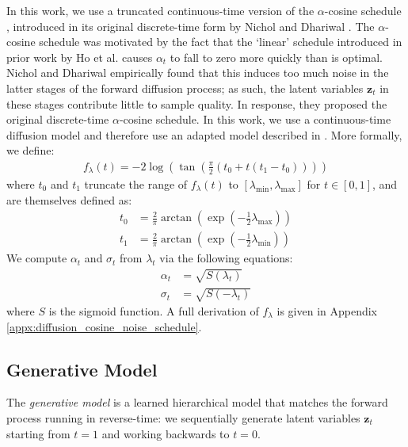 \documentclass[ oneside,%
                    author={George Herbert},
                    degree={MSci},
                     title={Video Diffusion Models for Climate Simulations},
                  subtitle={}]{dissertation}
\begin{document}
In this work, we use a truncated continuous-time version of the $\alpha$-cosine schedule \cite{IDDPM_Nichol}, introduced in its original discrete-time form by Nichol and Dhariwal \cite{IDDPM_Nichol}. The $\alpha$-cosine schedule was motivated by the fact that the `linear' schedule introduced in prior work by Ho et al. \cite{DDPM_Ho} causes $\alpha_t$ to fall to zero more quickly than is optimal. Nichol and Dhariwal empirically found that this induces too much noise in the latter stages of the forward diffusion process; as such, the latent variables $\mathbf{z}_t$ in these stages contribute little to sample quality. In response, they proposed the original discrete-time $\alpha$-cosine schedule. In this work, we use a continuous-time diffusion model and therefore use an adapted model described in \cite{Simple_Diffusion_Hoogeboom}. More formally, we define:
\begin{align}
      f_{\lambda}(t)=-2\log\left(\tan\left(\frac{\pi}{2}(t_0+t(t_1-t_0))\right)\right)
\end{align} 
where $t_0$ and $t_1$ truncate the range of $f_{\lambda}(t)$ to $[\lambda_{\min}, \lambda_{\max}]$ for $t\in[0,1]$, and are themselves defined as:
\begin{align}
      t_0&=\frac{2}{\pi}\arctan\left(\exp\left(-\frac{1}{2}\lambda_{\max}\right)\right)\\
      t_1&=\frac{2}{\pi}\arctan\left(\exp\left(-\frac{1}{2}\lambda_{\min}\right)\right)
\end{align}
We compute $\alpha_t$ and $\sigma_t$ from $\lambda_t$ via the following equations:
\begin{align}
      \alpha_t&=\sqrt{S(\lambda_t)}\\
      \sigma_t&=\sqrt{S(-\lambda_t)}
\end{align}
where $S$ is the sigmoid function. A full derivation of $f_\lambda$ is given in Appendix \ref{appx:diffusion_cosine_noise_schedule}.


\subsection{Generative Model}
\label{sec:background_diffusion_reverse}

The \textit{generative model} is a learned hierarchical model that matches the forward process running in reverse-time: we sequentially generate latent variables $\mathbf{z}_t$ starting from $t=1$ and working backwards to $t=0$.
\end{document}
